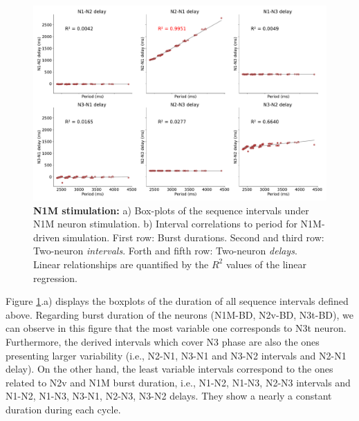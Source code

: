 \begin{figure}[hbt!]
\begin{minipage}[b]{0.53\textwidth}
\begin{minipage}[b]{\textwidth}
		\end{minipage}\
		\begin{minipage}[b]{\textwidth}
			\centering
			\includegraphics[width=\textwidth]{invariants/data/MODEL/n1m_driven/images/3phases/_delays.pdf}
		\end{minipage}
	\end{minipage}
	\caption{\textbf{N1M stimulation:} a) Box-plots of the  sequence intervals under N1M neuron stimulation. b) Interval correlations to period for N1M-driven simulation. First row: Burst durations. Second and third row: Two-neuron \textit{intervals}. Forth and fifth row: Two-neuron \textit{delays}. Linear relationships are quantified by the $R^2$ values of the linear regression.}
	\label{fig:invariant n1m}
\end{figure}

Figure \ref{fig:invariant n1m}.a) displays the boxplots of the duration of all sequence intervals defined above. Regarding burst duration of the neurons (N1M-BD, N2v-BD, N3t-BD), we can observe in this figure that the most variable one corresponds to N3t neuron. Furthermore, the derived intervals which cover N3 phase are also the ones presenting larger variability (i.e., N2-N1, N3-N1 and N3-N2 intervals and N2-N1 delay). On the other hand, the least variable intervals correspond to the ones related to N2v and N1M burst duration, i.e., N1-N2, N1-N3, N2-N3 intervals and N1-N2, N1-N3, N3-N1, N2-N3, N3-N2 delays. They show a nearly a constant duration during each cycle.

